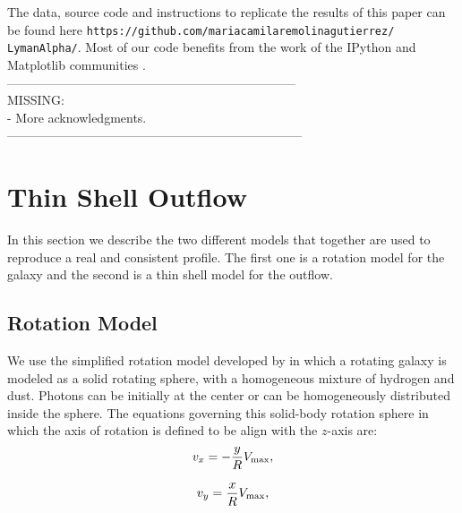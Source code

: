 \documentclass{latex/emulateapj}
\begin{document}
The data, source code and instructions to replicate the results of this paper can be found here {\texttt{https://github.com/mariacamilaremolinagutierrez/ LymanAlpha/}}.
Most of our code benefits from the work of the IPython and Matplotlib communities \citep{IPython,matplotlib}.\\

---------------------------------------------------------------------\\
MISSING: \\
- More acknowledgments.\\
-----------------------------------------------------------------------\\





\newpage


\appendix
\section{Thin Shell Outflow}

In this section we describe the two different models that together are used to reproduce a real and consistent \lya profile. The first one is a rotation model for the galaxy and the second is a thin shell model for the outflow. \\ 

\subsection{Rotation Model}

We use the simplified rotation model developed by \citep{Garavito14} in which a rotating galaxy is modeled as a solid rotating sphere, with a homogeneous mixture of hydrogen and dust. Photons can be initially at the center or can be homogeneously distributed inside the sphere. The equations governing this solid-body rotation sphere in
which the axis of rotation is defined to be align with the $z$-axis are: \\

\begin{equation}
v_{x}=-\frac{y}{R}V_{\rm max}, \label{subeq1}
\end{equation}

\begin{equation}
v_{y}=\frac{x}{R}V_{\rm max}, \label{subeq2}
\end{equation}
\end{document}
